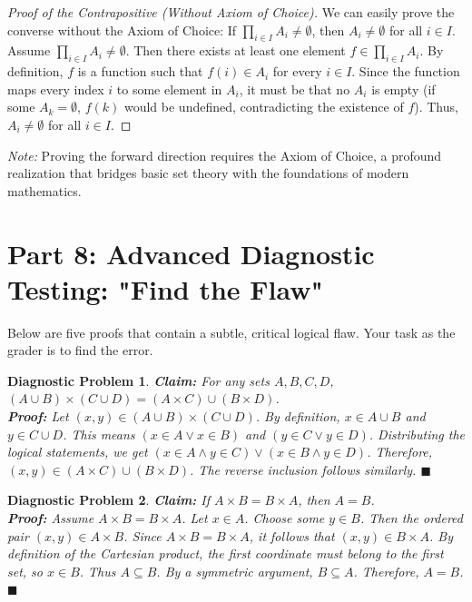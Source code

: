 \documentclass[11pt]{article}
\newtheorem{flawprob}{Diagnostic Problem}
\begin{document}
\begin{proof}[Proof of the Contrapositive (Without Axiom of Choice)]
We can easily prove the converse without the Axiom of Choice: If $\prod_{i \in I} A_i \neq \emptyset$, then $A_i \neq \emptyset$ for all $i \in I$.
Assume $\prod_{i \in I} A_i \neq \emptyset$. Then there exists at least one element $f \in \prod_{i \in I} A_i$. 
By definition, $f$ is a function such that $f(i) \in A_i$ for every $i \in I$. 
Since the function maps every index $i$ to some element in $A_i$, it must be that no $A_i$ is empty (if some $A_k = \emptyset$, $f(k)$ would be undefined, contradicting the existence of $f$). 
Thus, $A_i \neq \emptyset$ for all $i \in I$.
\end{proof}
\textit{Note:} Proving the forward direction requires the Axiom of Choice, a profound realization that bridges basic set theory with the foundations of modern mathematics.

\section{Part 8: Advanced Diagnostic Testing: "Find the Flaw"}

Below are five proofs that contain a subtle, critical logical flaw. Your task as the grader is to find the error.

\begin{flawprob}
\textbf{Claim:} For any sets $A, B, C, D$, $(A \cup B) \times (C \cup D) = (A \times C) \cup (B \times D)$. \\
\textbf{Proof:} Let $(x, y) \in (A \cup B) \times (C \cup D)$. By definition, $x \in A \cup B$ and $y \in C \cup D$. This means $(x \in A \lor x \in B)$ and $(y \in C \lor y \in D)$. Distributing the logical statements, we get $(x \in A \land y \in C) \lor (x \in B \land y \in D)$. Therefore, $(x, y) \in (A \times C) \cup (B \times D)$. The reverse inclusion follows similarly. $\blacksquare$
\end{flawprob}

\begin{flawprob}
\textbf{Claim:} If $A \times B = B \times A$, then $A = B$. \\
\textbf{Proof:} Assume $A \times B = B \times A$. Let $x \in A$. Choose some $y \in B$. Then the ordered pair $(x, y) \in A \times B$. Since $A \times B = B \times A$, it follows that $(x, y) \in B \times A$. By definition of the Cartesian product, the first coordinate must belong to the first set, so $x \in B$. Thus $A \subseteq B$. By a symmetric argument, $B \subseteq A$. Therefore, $A = B$. $\blacksquare$
\end{flawprob}
\end{document}
